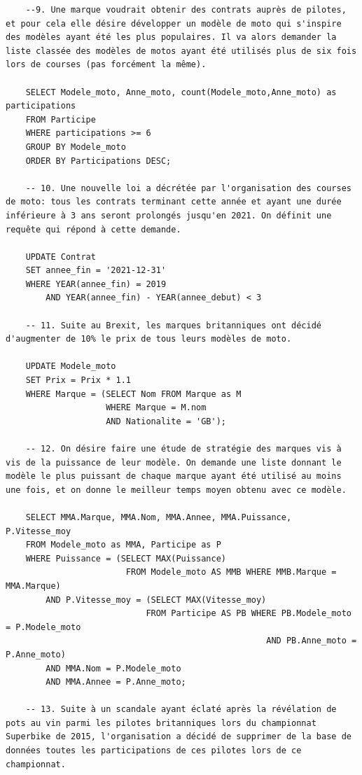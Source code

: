 \documentclass[12pt,a4paper]{article}
\newenvironment{code}{\captionsetup{type=listing}}{}
\begin{document}
\begin{code}
\begin{verbatim}
    --9. Une marque voudrait obtenir des contrats auprès de pilotes, et pour cela elle désire développer un modèle de moto qui s'inspire des modèles ayant été les plus populaires. Il va alors demander la liste classée des modèles de motos ayant été utilisés plus de six fois lors de courses (pas forcément la même).

    SELECT Modele_moto, Anne_moto, count(Modele_moto,Anne_moto) as participations 
    FROM Participe
    WHERE participations >= 6
    GROUP BY Modele_moto
    ORDER BY Participations DESC;
    
    -- 10. Une nouvelle loi a décrétée par l'organisation des courses de moto: tous les contrats terminant cette année et ayant une durée inférieure à 3 ans seront prolongés jusqu'en 2021. On définit une requête qui répond à cette demande.
    
    UPDATE Contrat 
    SET annee_fin = '2021-12-31'
    WHERE YEAR(annee_fin) = 2019
        AND YEAR(annee_fin) - YEAR(annee_debut) < 3
        
    -- 11. Suite au Brexit, les marques britanniques ont décidé d'augmenter de 10% le prix de tous leurs modèles de moto.

    UPDATE Modele_moto
    SET Prix = Prix * 1.1
    WHERE Marque = (SELECT Nom FROM Marque as M 
                    WHERE Marque = M.nom
                    AND Nationalite = 'GB');

    -- 12. On désire faire une étude de stratégie des marques vis à vis de la puissance de leur modèle. On demande une liste donnant le modèle le plus puissant de chaque marque ayant été utilisé au moins une fois, et on donne le meilleur temps moyen obtenu avec ce modèle.

    SELECT MMA.Marque, MMA.Nom, MMA.Annee, MMA.Puissance, P.Vitesse_moy
    FROM Modele_moto as MMA, Participe as P
    WHERE Puissance = (SELECT MAX(Puissance) 
                        FROM Modele_moto AS MMB WHERE MMB.Marque = MMA.Marque)
        AND P.Vitesse_moy = (SELECT MAX(Vitesse_moy)
                            FROM Participe AS PB WHERE PB.Modele_moto = P.Modele_moto
                                                    AND PB.Anne_moto = P.Anne_moto)
        AND MMA.Nom = P.Modele_moto
        AND MMA.Annee = P.Anne_moto;
    
    -- 13. Suite à un scandale ayant éclaté après la révélation de pots au vin parmi les pilotes britanniques lors du championnat Superbike de 2015, l'organisation a décidé de supprimer de la base de données toutes les participations de ces pilotes lors de ce championnat.


\end{verbatim}
\end{code}
\end{document}
